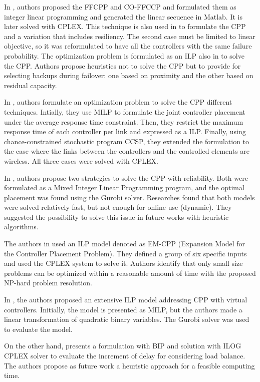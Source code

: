 \documentclass{IEEEtran}
\begin{document}
In \cite{KiRa16}, authors proposed the FFCPP and CO-FFCCP and formulated them as integer linear programming and generated the linear secuence in Matlab. It is later solved with CPLEX. This technique is also used in \cite{PeRe16} to formulate the CPP and a variation that includes resiliency. The second case must be limited to linear objective, so it was reformulated to have all the controllers with the same failure probability.
The optimization problem is formulated as an ILP also in \cite{MuOl14} to solve the CPP. Authors propose heuristics not to solve the CPP but to provide for selecting backups during failover: one based on proximity and the other based on residual capacity.

In \cite{AbMa17}, authors formulate an optimization problem to solve the CPP different techniques. Intially, they use MILP to formulate the joint controller placement under the average response time constraint. Then, they restrict the maximum response time of each controller per link and expressed as a ILP. Finally, using chance-constrained stochastic program CCSP, they extended the formulation to the case where the links between the controllers and the controlled elements are wireless. All three cases were solved with CPLEX.

In \cite{ViMa16}, authors propose two strategies to solve the CPP with reliability. Both were formulated as a Mixed Integer Linear Programming program, and the optimal placement was found using the Gurobi solver. Researches found that both models were solved relatively fast, but not enough for online use (dynamic). They suggested the possibility to solve this issue in future works with heuristic algorithms. 

The authors in \cite{SaHi17,SaSt15} used an ILP model denoted as EM-CPP (Expansion Model for the Controller Placement Problem). They defined a group of six specific inputs and used the CPLEX system to solve it. Authors identify that only small size problems can be optimized within a reasonable amount of time with the proposed NP-hard problem resolution. 

In \cite{VaPo17}, the authors proposed an extensive ILP model addressing CPP with virtual controllers. Initially, the model is presented as MILP, but the authors made a linear transformation of quadratic binary variables. The Gurobi solver was used to evaluate the model. 


On the other hand, \cite{HuLu16} presents a formulation with BIP and solution with ILOG CPLEX solver to evaluate the increment of delay for considering load balance. The authors propose as future work a heuristic approach for a feasible computing time. 
\end{document}
